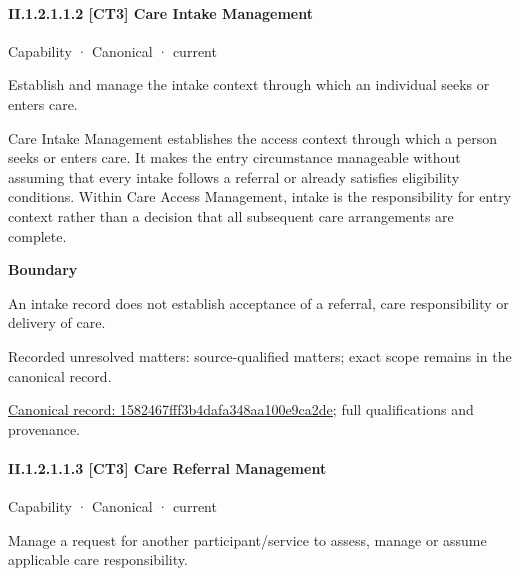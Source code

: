 \paragraph*{II.1.2.1.1.2 [CT3] Care Intake Management}
\label{navigation:II.1.2.1.1.2}

\label{element:1582467fff3b4dafa348aa100e9ca2de}
{\small Capability · Canonical · current}\par

Establish and manage the intake context through which an individual seeks or enters care.



Care Intake Management establishes the access context through which a person seeks or enters care. It makes the entry circumstance manageable without assuming that every intake follows a referral or already satisfies eligibility conditions. Within Care Access Management, intake is the responsibility for entry context rather than a decision that all subsequent care arrangements are complete.



\textbf{Boundary}



An intake record does not establish acceptance of a referral, care responsibility or delivery of care.


{\small Recorded unresolved matters: source-qualified matters; exact scope remains in the canonical record.}\par
{\footnotesize \href{../../../../continuum/strategy/capability/1582467fff3b4dafa348aa100e9ca2de.md}{Canonical record: 1582467fff3b4dafa348aa100e9ca2de}; full qualifications and provenance.}\par
\paragraph*{II.1.2.1.1.3 [CT3] Care Referral Management}
\label{navigation:II.1.2.1.1.3}

\label{element:ebdaa781bba542f8b744ef34a836a269}
{\small Capability · Canonical · current}\par

Manage a request for another participant/service to assess, manage or assume applicable care responsibility.



